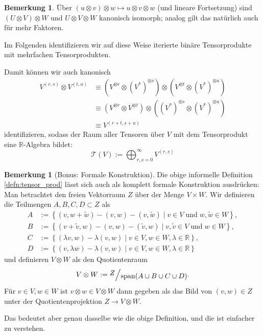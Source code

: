 \documentclass[a4paper]{scrbook}
\numberwithin{equation}{chapter}
\newcommand{\R}{\mathbb{R}}
\theoremstyle{definition}
\newtheorem{bem}[defn]{Bemerkung}
\begin{document}
\begin{bem}
	Über $(u\otimes v)\otimes w \mapsto u\otimes v\otimes w$ (und lineare Fortsetzung) sind $(U\otimes V)\otimes W$ und $U\otimes V\otimes W$ kanonisch isomorph; analog gilt das natürlich auch für mehr Faktoren.

	Im Folgenden identifizieren wir auf diese Weise iterierte binäre Tensorprodukte mit mehrfachen Tensorprodukten.

	Damit können wir auch kanonisch
	\begin{align*}
		V^{(r,s)} \otimes V^{(t,u)} &\equiv (V^{\otimes r} \otimes (V^*)^{\otimes s}) \otimes (V^{\otimes t} \otimes (V^*)^{\otimes u})\\
		&\equiv (V^{\otimes r} \otimes V^{\otimes t}) \otimes ((V^*)^{\otimes s} \otimes (V^*)^{\otimes u})\\
		&\equiv V^{(r+t, s+u)}
	\end{align*}
	identifizieren, sodass der Raum aller Tensoren über $V$ mit dem Tensorprodukt eine $\R$-Algebra bildet:
	\[\mathcal{T}(V) := \bigoplus_{r,s=0}^{\infty} V^{(r,s)}\]
\end{bem}

\begin{bem}[Bonus: Formale Konstruktion]
	Die obige informelle Definition \ref{defn:tensor_prod} lässt sich auch als komplett formale Konstruktion ausdrücken: Man betrachtet den freien Vektorraum $Z$ über der Menge $V\times W$. Wir definieren die Teilmengen $A,B,C,D \subset Z$ als
	\begin{align*}
		A &:= \left\{(v,w+\tilde w) - (v,w) - (v,\tilde w) \mid v\in V \; \text{und} \; w, \tilde w \in W\right\},\\
		B &:= \left\{(v+\tilde v,w) - (v,w) - (\tilde v,w) \mid v,\tilde v\in V \; \text{und} \; w\in W\right\},\\
		C &:= \left\{(\lambda v,w) - \lambda(v,w) \mid v\in V, w \in W, \lambda\in\R\right\},\\
		D &:= \left\{(v,\lambda w) - \lambda(v,w) \mid v\in V, w \in W, \lambda\in\R\right\}
	\end{align*}
	und definieren $V\otimes W$ als den Quotientenraum
	\[V\otimes W := \raise0.5ex\hbox{$Z$} \Big/ \lower0.5ex\hbox{$\mathrm{span}(A\cup B\cup C\cup D)$}.\]
	Für $v\in V, w\in W$ ist $v\otimes w \in V\otimes W$ dann gegeben als das Bild von $(v,w) \in Z$ unter der Quotientenprojektion $Z\to V\otimes W$.

	Das bedeutet aber genau dasselbe wie die obige Definition, und die ist einfacher zu verstehen.
\end{bem}
\end{document}
